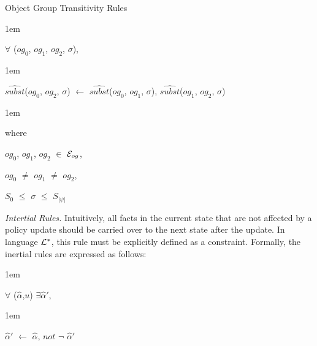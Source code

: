 \documentclass[11pt]{report}
\newenvironment{vquote}
{
  \begin{list}{}{\leftmargin 1em}\item[]
}
{
  \end{list}
}
\begin{document}
\begin{enumerate}
\begin{enumerate}
                  \item
                    Object Group Transitivity Rules

                    \begin{vquote}
                      $\forall$ ($og_{0}$, $og_{1}$, $og_{2}$, $\sigma$),
                    \end{vquote}

                    \begin{vquote}
                      $\hat{subst}$($og_{0}$, $og_{2}$, $\sigma$) $\leftarrow$
                      $\hat{subst}$($og_{0}$, $og_{1}$, $\sigma$),
                      $\hat{subst}$($og_{1}$, $og_{2}$, $\sigma$)
                    \end{vquote}

                    \begin{vquote}
                      where

                      \hspace{1em}
                      $og_{0}$, $og_{1}$, $og_{2}$ $\in$ ${\cal E}_{og}$,

                      \hspace{1em}
                      $og_{0}$ $\neq$ $og_{1}$ $\neq$ $og_{2}$,

                      \hspace{1em}
                      $S_{0}$ $\leq$ $\sigma$ $\leq$ $S_{|\psi|}$
                    \end{vquote}
                \end{enumerate}

              \item
                {\em Intertial Rules.}
                Intuitively, all facts in the current state that are not
                affected by a policy update should be carried over to the
                next state after the update. In language ${\cal L}^{*}$,
                this rule must be explicitly defined as a constraint. Formally,
                the inertial rules are expressed as follows:

                \begin{vquote}
                  $\forall$ ($\hat{\alpha}$,$u$) $\exists$$\hat{\alpha}'$,
                \end{vquote}

                \begin{vquote}
                  $\hat{\alpha}'$ $\leftarrow$
                    $\hat{\alpha}$, $not$ $\lnot$ $\hat{\alpha}'$


\end{vquote}
\end{enumerate}
\end{document}
